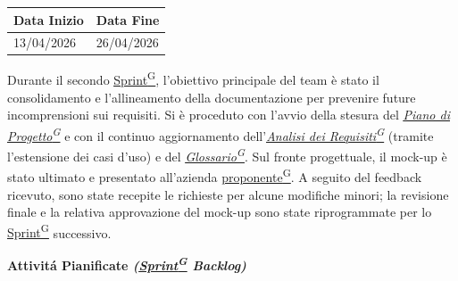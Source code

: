 \documentclass[a4paper,12pt]{article}
\providecommand{\glslink}[2]{\href{https://alittlebyte-19.github.io/Documentazione/glossario.html\#gls-#1}{\underline{#2}\textsuperscript{\scriptsize G}}}
\begin{document}
\label{sec:rtb_secondoperiodo}
\begin{table}[H]
    \centering
    \renewcommand{\arraystretch}{1.5} %
    \begin{tabularx}{\textwidth}{|X|X|}
    \hline \rowcolor{Dandelion!50}
    \textbf{Data Inizio} & \textbf{Data Fine}\\
    \hline
    13/04/2026 & 26/04/2026\\
    \hline

    \end{tabularx}
\end{table}

Durante il secondo \glslink{sprint}{Sprint}, l'obiettivo principale del team è stato il consolidamento e l'allineamento della documentazione per prevenire future incomprensioni sui requisiti. Si è proceduto con l'avvio della stesura del \textit{\glslink{piano-di-progetto}{Piano di Progetto}} e con il continuo aggiornamento dell'\textit{\glslink{analisi-dei-requisiti-adr}{Analisi dei Requisiti}} (tramite l'estensione dei casi d'uso) e del \textit{\glslink{glossario}{Glossario}}. Sul fronte progettuale, il mock-up è stato ultimato e presentato all'azienda \glslink{committente-proponente}{proponente}. A seguito del feedback ricevuto, sono state recepite le richieste per alcune modifiche minori; la revisione finale e la relativa approvazione del mock-up sono state riprogrammate per lo \glslink{sprint}{Sprint} successivo.\\

\begin{center}
\noindent\textbf{Attivitá Pianificate \textit{(\glslink{sprint}{Sprint} Backlog)}}\\
\end{center}
\end{document}
